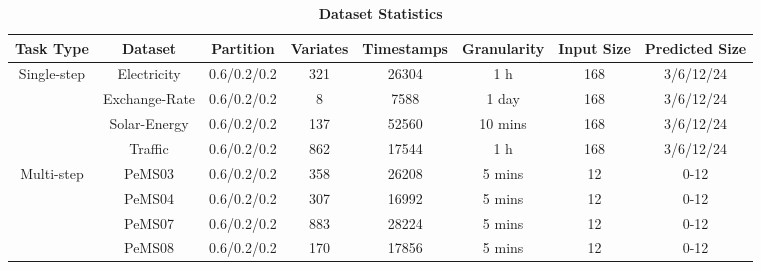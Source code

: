 \documentclass[final,12pt]{elsarticle}
\begin{document}
\begin{table}[h]  %
\label{tab-2}

  \caption{\textbf{Dataset Statistics}}
  \tiny
  \centering
  \renewcommand{\arraystretch}{1.5}

  \begin{tabular}{|c|c|c|c|c|c|c|c|}
    \hline  Task Type & Dataset       & Partition       & Variates        & Timestamps 
                      & Granularity   & Input Size      & Predicted Size  \\
    \hline  \multirow{4}{*}{Single-step} 
                      & Electricity   & 0.6/0.2/0.2     & 321             & 26304 
                      & 1 h           & 168             & 3/6/12/24       \\
                      & Exchange-Rate & 0.6/0.2/0.2     & 8               & 7588 
                      & 1 day         & 168             & 3/6/12/24       \\
                      & Solar-Energy  & 0.6/0.2/0.2     & 137             & 52560 
                      & 10 mins       & 168             & 3/6/12/24       \\
                      & Traffic       & 0.6/0.2/0.2     & 862             & 17544 
                      & 1 h           & 168             & 3/6/12/24       \\
    \hline  \multirow{4}{*}{Multi-step} 
                      & PeMS03        & 0.6/0.2/0.2     & 358             & 26208 
                      & 5 mins        & 12              & 0-12            \\
                      & PeMS04        & 0.6/0.2/0.2     & 307             & 16992 
                      & 5 mins        & 12              & 0-12            \\
                      & PeMS07        & 0.6/0.2/0.2     & 883             & 28224 
                      & 5 mins        & 12              & 0-12            \\
                      & PeMS08        & 0.6/0.2/0.2     & 170             & 17856 
                      & 5 mins        & 12              & 0-12            \\
    \hline
  \end{tabular}

\end{table}
\end{document}
